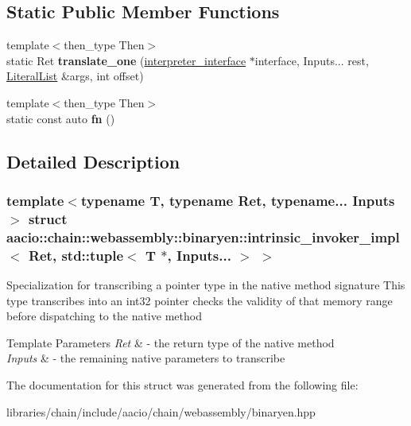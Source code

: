 \subsection*{Static Public Member Functions}
\begin{DoxyCompactItemize}
\item 
\mbox{\label{structaacio_1_1chain_1_1webassembly_1_1binaryen_1_1intrinsic__invoker__impl_3_01_ret_00_01std_1_f98b15d0d1a47e5a3a760fc9d76f6730_abaca3297ac8adf34cb7922a78ec307fb}} 
{\footnotesize template$<$then\+\_\+type Then$>$ }\\static Ret {\bfseries translate\+\_\+one} (\mbox{\hyperlink{structaacio_1_1chain_1_1webassembly_1_1binaryen_1_1interpreter__interface}{interpreter\+\_\+interface}} $\ast$interface, Inputs... rest, \mbox{\hyperlink{classstd_1_1vector}{Literal\+List}} \&args, int offset)
\item 
\mbox{\label{structaacio_1_1chain_1_1webassembly_1_1binaryen_1_1intrinsic__invoker__impl_3_01_ret_00_01std_1_f98b15d0d1a47e5a3a760fc9d76f6730_ae94e48251bc5ce1312644b5f56d57ccb}} 
{\footnotesize template$<$then\+\_\+type Then$>$ }\\static const auto {\bfseries fn} ()
\end{DoxyCompactItemize}


\subsection{Detailed Description}
\subsubsection*{template$<$typename T, typename Ret, typename... Inputs$>$\newline
struct aacio\+::chain\+::webassembly\+::binaryen\+::intrinsic\+\_\+invoker\+\_\+impl$<$ Ret, std\+::tuple$<$ T $\ast$, Inputs... $>$ $>$}

Specialization for transcribing a pointer type in the native method signature This type transcribes into an int32 pointer checks the validity of that memory range before dispatching to the native method


\begin{DoxyTemplParams}{Template Parameters}
{\em Ret} & -\/ the return type of the native method \\
\hline
{\em Inputs} & -\/ the remaining native parameters to transcribe \\
\hline
\end{DoxyTemplParams}


The documentation for this struct was generated from the following file\+:\begin{DoxyCompactItemize}
\item 
libraries/chain/include/aacio/chain/webassembly/binaryen.\+hpp\end{DoxyCompactItemize}
